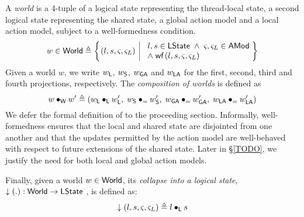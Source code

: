 %
%
\begin{definition}[Worlds]
A \emph{world} is a 4-tuple of a logical state representing the thread-local state, a second logical state representing the shared state, a global action model and a local action model, subject to a well-formedness condition.
%
\[
	w \in \Worlds \eqdef 
	\left\{
	\hspace*{-0.15cm}
	\begin{array}{l | l}
		(l, s, \amod{}, \amod{L}) & 
 		\begin{array}{l}
	 		l, s \in \LStates \;\land\; \amod{}, \amod{L} \in \AMods\\
	 		\land\; \wf{l, s, \amod{}, \amod{L}} 
	 	\end{array}
	 	\hspace*{-0.1cm}
	\end{array} 
	\hspace*{-0.15cm}
	\right\}
\]
% 
Given a world $w$, we write $w_{\textsf{L}}$, $w_{\textsf{S}}$, $w_{\textsf{GA}}$ and $w_{\textsf{LA}}$ for the first, second, third and fourth projections, respectively.
The \emph{composition of worlds} is defined as
%
\[
	w \bullet_{\textsf{W}} w' \triangleq (w_{\textsf{L}} \bullet_{\textsf{L}} w'_{\textsf{L}},\; w_{\textsf{S}} \bullet_{=} w'_{\textsf{S}},\; w_{\textsf{GA}} \bullet_{=} w'_{\textsf{GA}},\; w_{\textsf{LA}} \bullet_{=} w'_{\textsf{LA}})
\]
%
We defer the formal definition of  to the proceeding section. Informally, well-formedness ensures that the local and shared state are disjointed from one another and that the updates permitted by the action model are well-behaved with respect to future extensions of the shared state. Later in \S\ref{TODO}, we justify the need for both local and global action models.

Finally, given a world $w \in \textsf{World}$, its \emph{collapse into a logical state},
%
$
	\downarrow\left(.\right): \textsf{World} \rightarrow \textsf{LState}
$
%
, is defined as:
%
\[
	\downarrow\left(l, s, \varsigma_{}, \varsigma_{L}\right) \triangleq l \bullet_{\textsf{L}} s
\]
%
\end{definition}
%
%
